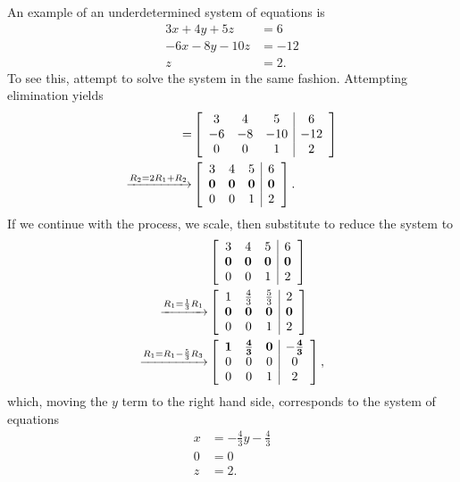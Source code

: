 \documentclass[10pt]{article}
\begin{document}
An example of an underdetermined system of equations is 
\begin{align*}
3x + 4y + 5z & = 6 \\
-6x - 8y - 10z & = -12 \\
z & = 2.
\end{align*}
To see this, attempt to solve the system in the same fashion. Attempting elimination yields 
\begin{align*} 
[A \, | b]  = & \left[ \begin{array}{ccc|ccc|c}
3 & 4 & 5 &  6 \\
-6 & -8 & -10 & -12 \\
0 & 0 & 1 & 2
\end{array}\right] \\
\xrightarrow{R_2 = 2 R_1 + R_2} 
& \left[ \begin{array}{ccc|ccc|c}
3 & 4 & 5  & 6 \\
{\bf 0} & {\bf 0} & {\bf 0} &  {\bf 0} \\ 
0 & 0 & 1 & 2
\end{array}\right].
\end{align*}
If we continue with the process, we scale, then substitute to reduce the system to 
\begin{align*} 
& \left[ \begin{array}{ccc|ccc|c}
3 & 4 & 5  & 6 \\
{\bf 0} & {\bf 0} & {\bf 0} &  {\bf 0} \\ 
0 & 0 & 1 & 2
\end{array}\right] \\
\xrightarrow{R_1 = \frac{1}{3} R_1} & 
\left[ \begin{array}{ccc|ccc|c}
1 & \frac{4}{3} & \frac{5}{3}  & 2 \\
{\bf 0} & {\bf 0} & {\bf 0} &  {\bf 0} \\ 
0 & 0 & 1 & 2
\end{array}\right] \\
\xrightarrow{R_1 = R_1 - \frac{5}{3} R_3} & 
\left[ \begin{array}{ccc|ccc|c}
{\bf 1} & {\bf \frac{4}{3}} & {\bf 0} & {\bf -\frac{4}{3}} \\
0 & 0 & 0 & 0 \\
0 & 0 & 1 & 2
\end{array}\right],
\end{align*}
which, moving the $y$ term to the right hand side, corresponds to the system of equations
\begin{align*}
x & = -\frac{4}{3}y - \frac{4}{3} \\
0 & = 0 \\
z & = 2.
\end{align*}
\end{document}
